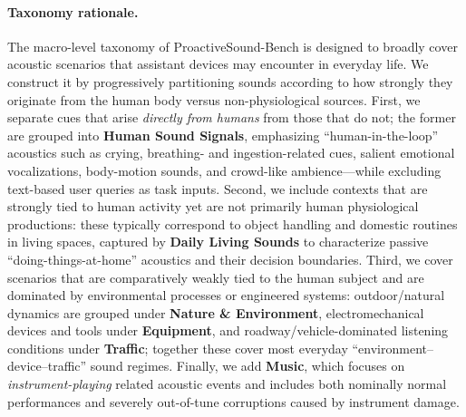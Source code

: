 \documentclass{article}
\begin{document}
\paragraph{Taxonomy rationale.}
The macro-level taxonomy of ProactiveSound-Bench is designed to broadly cover acoustic scenarios that assistant devices may encounter in everyday life.
We construct it by progressively partitioning sounds according to how strongly they originate from the human body versus non-physiological sources.
First, we separate cues that arise \emph{directly from humans} from those that do not; the former are grouped into \textbf{Human Sound Signals}, emphasizing ``human-in-the-loop'' acoustics such as crying, breathing- and ingestion-related cues, salient emotional vocalizations, body-motion sounds, and crowd-like ambience---while excluding text-based user queries as task inputs.
Second, we include contexts that are strongly tied to human activity yet are not primarily human physiological productions: these typically correspond to object handling and domestic routines in living spaces, captured by \textbf{Daily Living Sounds} to characterize passive ``doing-things-at-home'' acoustics and their decision boundaries.
Third, we cover scenarios that are comparatively weakly tied to the human subject and are dominated by environmental processes or engineered systems: outdoor/natural dynamics are grouped under \textbf{Nature \& Environment}, electromechanical devices and tools under \textbf{Equipment}, and roadway/vehicle-dominated listening conditions under \textbf{Traffic}; together these cover most everyday ``environment--device--traffic'' sound regimes.
Finally, we add \textbf{Music}, which focuses on \emph{instrument-playing} related acoustic events and includes both nominally normal performances and severely out-of-tune corruptions caused by instrument damage.
\end{document}
